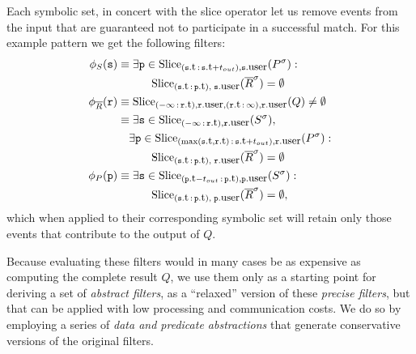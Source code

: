 Each symbolic set, in concert with the slice operator let us remove events from
the input that are guaranteed not to participate in a successful match.
For this example pattern we get the following filters:
\begin{align*}
\precs{S}(\symv{s}) 
&\equiv  
\exists \symv{p} \in 
\slice{\syms{P}}
{(\facc{\symv{s}}{t}\,:\,\facc{\symv{s}}{t} + t_{out}),
	\facc{\symv{s}}{user}} :\ 
\\
&\qquad\quad
\slice{\syms{\oR}}
{(\facc{\symv{s}}{t}\,:\,\facc{\symv{p}}{t}),\; \facc{\symv{s}}{user}}
= \emptyset 
\\
\precs{\oR}(\symv{r}) 
&\equiv
\slice{Q}
{(-\infty\,:\,\facc{\symv{r}}{t}), 
	\facc{\symv{r}}{user}, 
	(\facc{\symv{r}}{t}\,:\,\infty), 
	\facc{\symv{r}}{user}} 
\neq \emptyset 
\\
&\equiv
\exists \symv{s} \in 
\slice{\syms{S}}{(-\infty\,:\,\facc{\symv{r}}{t}), \facc{\symv{r}}{user}},
\\
&\quad
\exists \symv{p} \in 
\slice{\syms{P}}
{(\max(\facc{\symv{s}}{t},\facc{\symv{r}}{t})\,:\,\facc{\symv{s}}{t} + t_{out}),
	\facc{\symv{r}}{user}}
: 
\\ 
&\qquad\quad
\slice{\syms{\oR}}
{(\facc{\symv{s}}{t}\,:\,\facc{\symv{p}}{t}),\; \facc{\symv{r}}{user}} 
= \emptyset  
\\
\precs{P}(\symv{p}) 
&\equiv  
\exists \symv{s} \in 
\slice{\syms{S}}
{(\facc{\symv{p}}{t} - t_{out}\,:\,\facc{\symv{p}}{t}),  
	\facc{\symv{p}}{user}} :\
\\
&\qquad\quad
\slice{\syms{\oR}}
{(\facc{\symv{s}}{t}\,:\,\facc{\symv{p}}{t}),\; \facc{\symv{p}}{user}}
= \emptyset,
\end{align*}
which when applied to their corresponding symbolic set will retain only those 
events that contribute to the output of $Q$. 

Because evaluating these filters would in many cases be as expensive as 
computing
the complete result $Q$, we use them only as a starting point for deriving a set
of {\em abstract filters}, as a ``relaxed'' version of these
{\em precise filters}, but that can be applied with low processing and 
communication costs.
We do so by employing a series of {\em data and predicate abstractions} 
that generate conservative versions of the original filters.

\newcommand{\NotExistsP}{\ident{NotExistsP}}
\newcommand{\PrecedesP}{\precs{S}}
\newcommand{\PrecedesPP}{\omega_S}
\newcommand{\PrecedesPPP}{\psi_S}
\newcommand{\PrecedesPPPP}{\upsilon_S}


